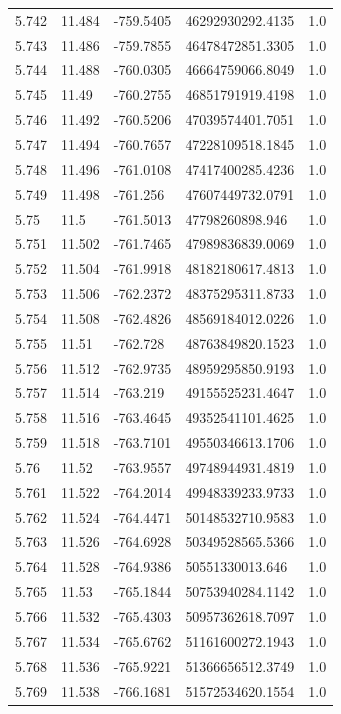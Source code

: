 \begin{tabular}{lllll}
5.742 & 11.484 & -759.5405 & 46292930292.4135 & 1.0 \\
5.743 & 11.486 & -759.7855 & 46478472851.3305 & 1.0 \\
5.744 & 11.488 & -760.0305 & 46664759066.8049 & 1.0 \\
5.745 & 11.49 & -760.2755 & 46851791919.4198 & 1.0 \\
5.746 & 11.492 & -760.5206 & 47039574401.7051 & 1.0 \\
5.747 & 11.494 & -760.7657 & 47228109518.1845 & 1.0 \\
5.748 & 11.496 & -761.0108 & 47417400285.4236 & 1.0 \\
5.749 & 11.498 & -761.256 & 47607449732.0791 & 1.0 \\
5.75 & 11.5 & -761.5013 & 47798260898.946 & 1.0 \\
5.751 & 11.502 & -761.7465 & 47989836839.0069 & 1.0 \\
5.752 & 11.504 & -761.9918 & 48182180617.4813 & 1.0 \\
5.753 & 11.506 & -762.2372 & 48375295311.8733 & 1.0 \\
5.754 & 11.508 & -762.4826 & 48569184012.0226 & 1.0 \\
5.755 & 11.51 & -762.728 & 48763849820.1523 & 1.0 \\
5.756 & 11.512 & -762.9735 & 48959295850.9193 & 1.0 \\
5.757 & 11.514 & -763.219 & 49155525231.4647 & 1.0 \\
5.758 & 11.516 & -763.4645 & 49352541101.4625 & 1.0 \\
5.759 & 11.518 & -763.7101 & 49550346613.1706 & 1.0 \\
5.76 & 11.52 & -763.9557 & 49748944931.4819 & 1.0 \\
5.761 & 11.522 & -764.2014 & 49948339233.9733 & 1.0 \\
5.762 & 11.524 & -764.4471 & 50148532710.9583 & 1.0 \\
5.763 & 11.526 & -764.6928 & 50349528565.5366 & 1.0 \\
5.764 & 11.528 & -764.9386 & 50551330013.646 & 1.0 \\
5.765 & 11.53 & -765.1844 & 50753940284.1142 & 1.0 \\
5.766 & 11.532 & -765.4303 & 50957362618.7097 & 1.0 \\
5.767 & 11.534 & -765.6762 & 51161600272.1943 & 1.0 \\
5.768 & 11.536 & -765.9221 & 51366656512.3749 & 1.0 \\
5.769 & 11.538 & -766.1681 & 51572534620.1554 & 1.0 \\

\end{tabular}
